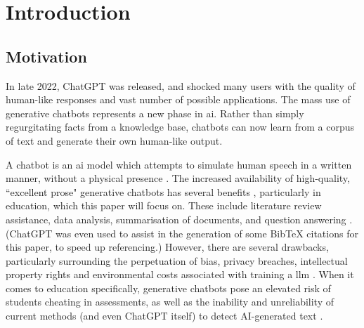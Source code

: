 \chapter{Introduction}\label{ch:introduction}




\section{Motivation} %
\label{sec:intro_motivation}

In late 2022, ChatGPT was released, and shocked many users with the quality of human-like responses and vast number of possible applications. The mass use of generative chatbots represents a new phase in \acrfull{ai}. Rather than simply regurgitating facts from a knowledge base, chatbots can now learn from a corpus of text and generate their own human-like output.

A chatbot is an \acrshort{ai} model which attempts to simulate human speech in a written manner, without a physical presence \citep{Nee2023ExploringTT}. The increased availability of high-quality, ``excellent prose" generative chatbots has several benefits \citep{Floridi}, particularly in education, which this paper will focus on. These include literature review assistance, data analysis, summarisation of documents, and question answering \citep{lund2023chatting}. (ChatGPT was even used to assist in the generation of some BibTeX citations for this paper, to speed up referencing.) However, there are several drawbacks, particularly surrounding the perpetuation of bias, privacy breaches, intellectual property rights and environmental costs associated with training a \acrfull{llm} \citep{Jungherr, Bender21}. When it comes to education specifically, generative chatbots pose an elevated risk of students cheating in assessments, as well as the inability and unreliability of current methods (and even ChatGPT itself) to detect AI-generated text \citep{susnjak2022, Cotton}.

